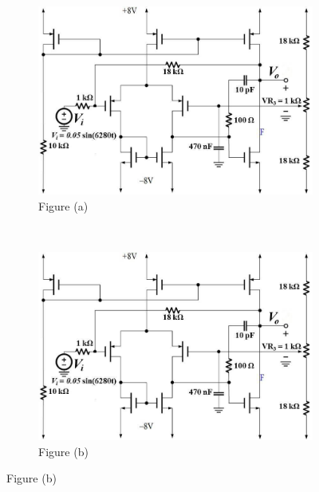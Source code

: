 \documentclass{article}
\begin{document}
\begin{CJK*}{UTF8}{bkai}
\begin{figure}[h]
\begin{center}
        \begin{subfigure}[b]{0.45\textwidth}
            \includegraphics[width=\textwidth]{CMOS_simple.png}
            \caption*{Figure (a)}
        \end{subfigure}
        ~
        \begin{subfigure}[b]{0.45\textwidth}
            \includegraphics[width=\textwidth]{CMOS_complicated.png}
            \caption*{Figure (b)}
        \end{subfigure}
    \end{center}
\end{figure}



\end{CJK*}
\end{document}
